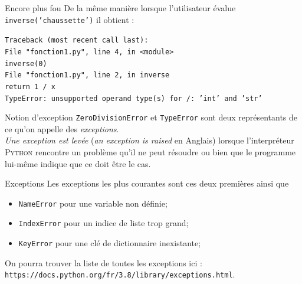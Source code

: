 \documentclass[10pt]{nsibeamer}
\begin{document}
\begin{frame}[fragile]{Encore plus fou}
    De la même manière lorsque l'utilisateur évalue \texttt{inverse('chaussette')} il obtient :\\\pause
    
    {\color{red}\texttt{Traceback (most recent call last):\\
            \hspace{2em}File "fonction1.py", line 4, in <module>\\
            \hspace{4em}inverse(0)\\
            \hspace{2em}File "fonction1.py", line 2, in inverse\\
            \hspace{4em}return 1 / x\\
            TypeError: unsupported operand type(s) for /: 'int' and 'str'}}
\end{frame}

\begin{frame}[fragile]{Notion d'exception}
    \texttt{ZeroDivisionError} et \texttt{TypeError} sont deux représentants de ce qu'on appelle des \textit{exceptions}.\\\pause
    \textit{Une exception est levée} (\textit{an exception is raised} en Anglais) lorsque l'interpréteur \textsc{Python} rencontre un problème qu'il ne peut résoudre ou bien que le programme lui-même indique que ce doit être le cas.    
\end{frame}

\begin{frame}[fragile]{Exceptions}
    Les exceptions les plus courantes sont ces deux premières ainsi que 
    \begin{itemize}
        \item   \texttt{NameError} pour une variable non définie;
        \item   \texttt{IndexError} pour un indice de liste trop grand;
        \item   \texttt{KeyError} pour une clé de dictionnaire inexistante;
    \end{itemize}
    
    On pourra trouver la liste de toutes les exceptions ici :\\
    \texttt{https://docs.python.org/fr/3.8/library/exceptions.html}.       
\end{frame}
\end{document}
